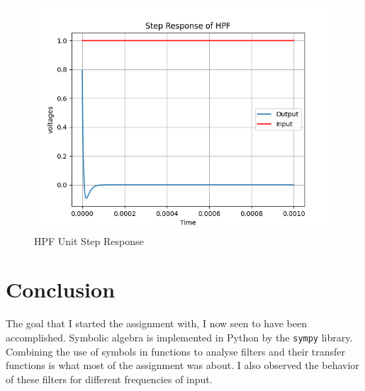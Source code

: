 \documentclass[11pt, a4paper]{article}
\begin{document}
  \begin{figure}[!tbh]
   	\centering
  \includegraphics[scale=0.5]{q5.png} 
    \caption{HPF Unit Step Response}
   \end{figure} 

\section{Conclusion}
The goal that I started the assignment with, I now seen to have been accomplished. Symbolic algebra is implemented in Python by the \texttt{sympy} library. Combining the use of symbols in functions to analyse filters and their transfer functions is what most of the assignment was about. I also observed the behavior of these filters for different frequencies of input. 
\end{document}
